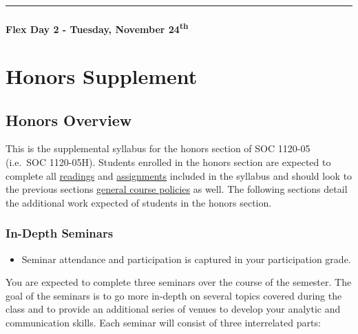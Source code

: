 \documentclass[
]{book}
\newenvironment{rmdblock}[1]
  {\begin{shaded*}
  \begin{itemize}
  \renewcommand{\labelitemi}{
    \raisebox{-.7\height}[0pt][0pt]{
      {\setkeys{Gin}{width=3em,keepaspectratio}\texttt{[image: images/\#1]}}
    }
  }
  \item
  }
  {
  \end{itemize}
  \end{shaded*}
  }
\newenvironment{rmdtip}
  {\begin{rmdblock}{tip}}
  {\end{rmdblock}}
\begin{document}
\begin{center}\rule{0.5\linewidth}{0.5pt}\end{center}

\hypertarget{flex-day-2---tuesday-november-24th}{%
\subsection*{\texorpdfstring{Flex Day 2 - Tuesday, November 24\textsuperscript{th}}{Flex Day 2 - Tuesday, November 24th}}\label{flex-day-2---tuesday-november-24th}}

\hypertarget{part-honors-supplement}{%
\part{Honors Supplement}\label{part-honors-supplement}}

\hypertarget{honors-overview}{%
\chapter{Honors Overview}\label{honors-overview}}

This is the supplemental syllabus for the honors section of SOC 1120-05 (i.e.~SOC 1120-05H). Students enrolled in the honors section are expected to complete all \href{/lecture-schedule.html}{readings} and \href{/assignments-and-grading.html}{assignments} included in the syllabus and should look to the previous sections \href{/course-policies.html}{general course policies} as well. The following sections detail the additional work expected of students in the honors section.

\hypertarget{in-depth-seminars}{%
\section{In-Depth Seminars}\label{in-depth-seminars}}

\begin{rmdtip}
Seminar attendance and participation is captured in your participation
grade.
\end{rmdtip}

You are expected to complete three seminars over the course of the semester. The goal of the seminars is to go more in-depth on several topics covered during the class and to provide an additional series of venues to develop your analytic and communication skills. Each seminar will consist of three interrelated parts:
\end{document}

